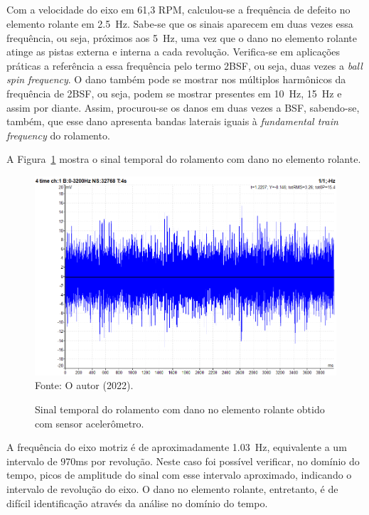 \documentclass[
	12pt,				
	oneside,			
	a4paper,			
	english,			
	brazil,	
	sumario=abnt-6027-2012		
	]{abntex2ppgsi}
\begin{document}
\subsection{}

Com a velocidade do eixo em 61,3 RPM, calculou-se a frequência de defeito no elemento rolante em \SI{2,5}{\hertz}. Sabe-se que os sinais aparecem em duas vezes essa frequência, ou seja, próximos aos \SI{5}{\hertz}, uma vez que o dano no elemento rolante atinge as pistas externa e interna a cada revolução. Verifica-se em aplicações práticas a referência a essa frequência pelo termo 2BSF, ou seja, duas vezes a \textit{ball spin frequency}. O dano também pode se mostrar nos múltiplos harmônicos da frequência de 2BSF, ou seja, podem se mostrar presentes em \SI{10}{\hertz}, \SI{15}{\hertz} e assim por diante. Assim, procurou-se os danos em duas vezes a BSF, sabendo-se, também, que esse dano apresenta bandas laterais iguais à \textit{fundamental train frequency} do rolamento. 

A Figura~\ref{dominio_tempo_defeito_rolante_acelerometro_100hz} mostra o sinal temporal do rolamento com dano no elemento rolante.

\begin{figure}[H]
\centering
\caption {Sinal temporal do rolamento com dano no elemento rolante obtido com sensor acelerômetro.}
\includegraphics[width=\textwidth,keepaspectratio]{dominio_tempo_defeito_rolante_acelerometro_100hz} \\
Fonte: O autor (2022).
\label{dominio_tempo_defeito_rolante_acelerometro_100hz}
\end{figure}

A frequência do eixo motriz é de aproximadamente \SI{1,03}{\hertz}, equivalente a um intervalo de 970ms por revolução. Neste caso foi possível verificar, no domínio do tempo, picos de amplitude do sinal com esse intervalo aproximado, indicando o intervalo de revolução do eixo. O dano no elemento rolante, entretanto, é de difícil identificação através da análise no domínio do tempo. 
\end{document}
